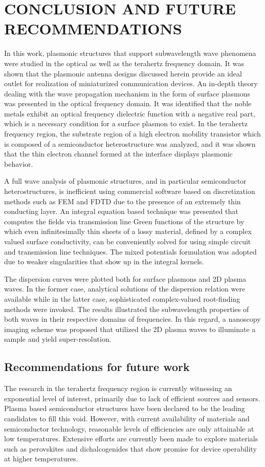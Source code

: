 \chapter{\uppercase {Conclusion and Future recommendations}}

In this work, plasmonic structures that support subwavelength wave phenomena were studied in the optical as well as the terahertz frequency domain. It was shown that the plasmonic antenna designs discussed herein provide an ideal outlet for realization of miniaturized communication devices. An in-depth theory dealing with the wave propagation mechanism in the form of surface plasmons was presented in the optical frequency domain. It was identified that the noble metals exhibit an optical frequency dielectric function with a negative real part, which is a necessary condition for a surface plasmon to exist. In the terahertz frequency region, the substrate region of a high electron mobility transistor which is composed of a semiconductor heterostructure was analyzed, and it was shown that the thin electron channel formed at the interface displays plasmonic behavior.

A full wave analysis of plasmonic structures, and in particular semiconductor heterostructures, is inefficient using commercial software based on discretization methods such as FEM and FDTD due to the presence of an extremely thin conducting layer. An integral equation based technique was presented that computes the fields via transmission line Green functions of the structure by which even infinitesimally thin sheets of a lossy material, defined by a complex valued surface conductivity, can be conveniently solved for using simple circuit and transmission line techniques. The mixed potentials formulation was adopted due to weaker singularities that show up in the integral kernels.

The dispersion curves were plotted both for surface plasmons and 2D plasma waves. In the former case, analytical solutions of the dispersion relation were available while in the latter case, sophisticated complex-valued root-finding methods were invoked. The results illustrated the subwavelength properties of both waves in their respective domains of frequencies. In this regard, a nanoscopy imaging scheme was proposed that utilized the 2D plasma waves to illuminate a sample and yield super-resolution.

\section*{Recommendations for future work}
%
%
The research in the terahertz frequency region is currently witnessing an exponential level of interest, primarily due to lack of efficient sources and sensors. Plasma based semiconductor structures have been declared to be the leading candidates to fill this void. However, with current availability of materials and semiconductor technology, reasonable levels of efficiencies are only attainable at low temperatures. Extensive efforts are currently been made to explore materials such as perovskites and dichalcogenides that show promise for device operability at higher temperatures.

